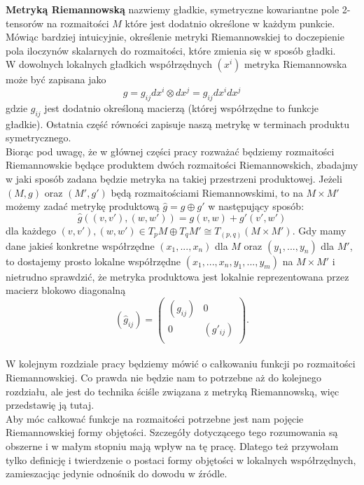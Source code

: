 \documentclass[licencjacka]{pracamgr}
\theoremstyle{definition}
\theoremstyle{definition}
\theoremstyle{plain}
\theoremstyle{plain}
\theoremstyle{plain}
\theoremstyle{plain}
\begin{document}
\textbf{Metryką Riemannowską} nazwiemy gładkie, symetryczne kowariantne
pole 2-tensorów na rozmaitości
$M$ które jest dodatnio określone w każdym punkcie. Mówiąc bardziej
intuicyjnie, określenie metryki Riemannowskiej to doczepienie 
pola iloczynów skalarnych do rozmaitości, które zmienia się w sposób gładki.
\\

W dowolnych lokalnych gładkich współrzędnych $(x^i)$ metryka Riemannowska
może być zapisana jako
\[ %
    g = g_{ij} dx^i \otimes dx^j = g_{ij} dx^i dx^j
\]
gdzie
$g_{ij}$
jest dodatnio określoną macierzą (której współrzędne to funkcje gładkie). Ostatnia
część równości zapisuje naszą metrykę w terminach produktu symetrycznego. \\

Biorąc pod uwagę, że w głównej części pracy rozważać będziemy
rozmaitości Riemannowskie będące produktem dwóch rozmaitości
Riemannowskich, zbadajmy w jaki sposób zadana będzie metryka na takiej
przestrzeni produktowej. Jeżeli $(M, g)$ oraz $(M', g')$ będą rozmaitościami
Riemannowskimi, to na $M \times M'$ możemy zadać metrykę produktową
 $\hat g = g \oplus g'$ w następujący sposób:
\[
\hat g
 \left( (v, v'), (w, w') \right) =
 g(v, w) + g'(v', w')
\]
dla każdego
 $(v, v'), (w, w') \in T_p M \oplus T_q M' \cong T_{(p, q)} (M \times M')$.
Gdy mamy dane jakieś konkretne współrzędne $(x_1, ... , x_n)$ dla $M$ oraz
$(y_1, ..., y_n)$ dla $M'$, to dostajemy prosto lokalne współrzędne
$(x_1, ..., x_n, y_1, ..., y_m)$ na $M \times M'$ i nietrudno sprawdzić, 
że metryka produktowa jest lokalnie reprezentowana przez macierz blokowo diagonalną
\[
  \left(\hat g_{ij} \right)  = 
  \left(
    \begin{array}{cc}
  \left( g_{ij} \right) &  0 \\
      0      & \left( g'_{ij} \right) \\
      \end{array}
  \right).
\] \\

W kolejnym rozdziale pracy będziemy mówić o całkowaniu funkcji po rozmaitości
Riemannowskiej. Co prawda nie będzie nam to potrzebne aż do kolejnego 
rozdziału, ale jest do technika ściśle związana z metryką Riemannowską, więc
przedstawię ją tutaj. \\

Aby móc całkować funkcje na rozmaitości potrzebne jest nam pojęcie
Riemannowskiej formy objętości. Szczegóły dotyczącego tego rozumowania 
są obszerne i w małym stopniu mają wpływ na tę pracę. Dlatego też
przywołam tylko definicję i twierdzenie o postaci formy objętości
w lokalnych współrzędnych, zamieszacjąc jedynie odnośnik do dowodu w 
źródle. \\
\end{document}
